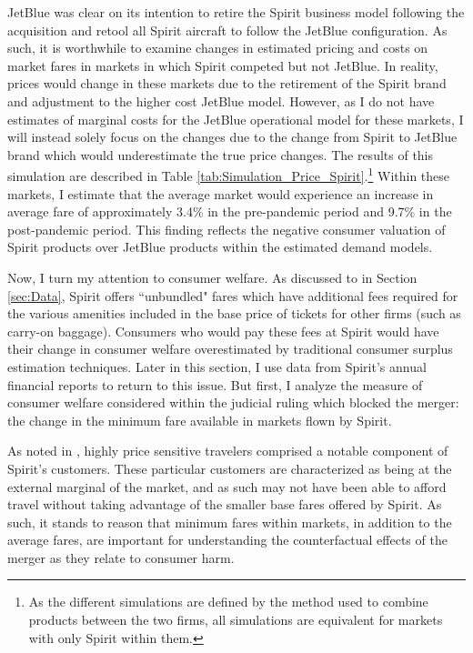 \documentclass{article}
\begin{document}
     JetBlue was clear on its intention to retire the Spirit business model following the acquisition and retool all Spirit aircraft to follow the JetBlue configuration. As such, it is worthwhile to examine changes in estimated pricing and costs on market fares in markets in which Spirit competed but not JetBlue. In reality, prices would change in these markets due to the retirement of the Spirit brand and adjustment to the higher cost JetBlue model. However, as I do not have estimates of marginal costs for the JetBlue operational model for these markets, I will instead solely focus on the changes due to the change from Spirit to JetBlue brand which would underestimate the true price changes. The results of this simulation are described in Table \ref{tab:Simulation_Price_Spirit}.\footnote{As the different simulations are defined by the method used to combine products between the two firms, all simulations are equivalent for markets with only Spirit within them.} Within these markets, I estimate that the average market would experience an increase in average fare of approximately 3.4\% in the pre-pandemic period and 9.7\% in the post-pandemic period. This finding reflects the negative consumer valuation of Spirit products over JetBlue products within the estimated demand models.



     Now, I turn my attention to consumer welfare. As discussed to in Section \ref{sec:Data}, Spirit offers ``unbundled" fares which have additional fees required for the various amenities included in the base price of tickets for other firms (such as carry-on baggage). Consumers who would pay these fees at Spirit would have their change in consumer welfare overestimated by traditional consumer surplus estimation techniques. Later in this section, I use data from Spirit's annual financial reports to return to this issue. But first, I analyze the measure of consumer welfare considered within the judicial ruling which blocked the merger: the change in the minimum fare available in markets flown by Spirit. %
     
     As noted in \citet{william_g_young_findings_2024}, highly price sensitive travelers comprised a notable component of Spirit's customers. These particular customers are characterized as being at the external marginal of the market, and as such may not have been able to afford travel without taking advantage of the smaller base fares offered by Spirit. As such, it stands to reason that minimum fares within markets, in addition to the average fares, are important for understanding the counterfactual effects of the merger as they relate to consumer harm. 
     
\end{document}
